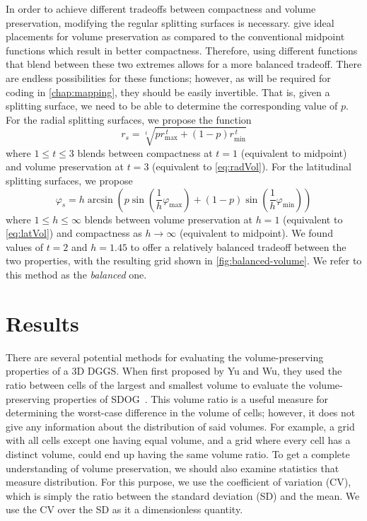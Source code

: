In order to achieve different tradeoffs between compactness and volume preservation, modifying the regular splitting surfaces is necessary.
 give ideal placements for volume preservation as compared to the conventional midpoint functions which result in better compactness.
Therefore, using different functions that blend between these two extremes allows for a more balanced tradeoff.
There are endless possibilities for these functions; however, as will be required for coding in \cref{chap:mapping}, they should be easily invertible.
That is, given a splitting surface, we need to be able to determine the corresponding value of $p$.
For the radial splitting surfaces, we propose the function
%
\begin{equation} \label{eq:radBlend}
r_{s} = \sqrt[t]{ p r_\mathrm{max}^{\,t} + \left( 1 - p \right) r_\mathrm{min}^{\,t} }
\end{equation}
%
where $1 \leq t \leq 3$ blends between compactness at $t = 1$ (equivalent to midpoint) and volume preservation at $t=3$ (equivalent to \cref{eq:radVol}).
For the latitudinal splitting surfaces, we propose
%
\begin{equation} \label{eq:latBlend}
\varphi_{s} = h \arcsin \left( p \sin \left( \frac{1}{h} \varphi_\mathrm{max} \right) + \left( 1 - p \right) \sin \left( \frac{1}{h} \varphi_\mathrm{min} \right) \right)
\end{equation}
%
where $1 \leq h \leq \infty$ blends between volume preservation at $h = 1$ (equivalent to \cref{eq:latVol}) and compactness as $h \rightarrow \infty$ (equivalent to midpoint).
We found values of $t = 2$ and $h = 1.45$ to offer a relatively balanced tradeoff between the two properties, with the resulting grid shown in \cref{fig:balanced-volume}.
We refer to this method as the \textit{balanced} one.


\section{Results} \label{chap:4:results}
There are several potential methods for evaluating the volume-preserving properties of a 3D DGGS.
When first proposed by Yu and Wu, they used the ratio between cells of the largest and smallest volume to evaluate the volume-preserving properties of SDOG~\cite{yu2009sdog}.
This volume ratio is a useful measure for determining the worst-case difference in the volume of cells; however, it does not give any information about the distribution of said volumes.
For example, a grid with all cells except one having equal volume, and a grid where every cell has a distinct volume, could end up having the same volume ratio.
To get a complete understanding of volume preservation, we should also examine statistics that measure distribution.
For this purpose, we use the coefficient of variation (CV), which is simply the ratio between the standard deviation (SD) and the mean.
We use the CV over the SD as it a dimensionless quantity.


